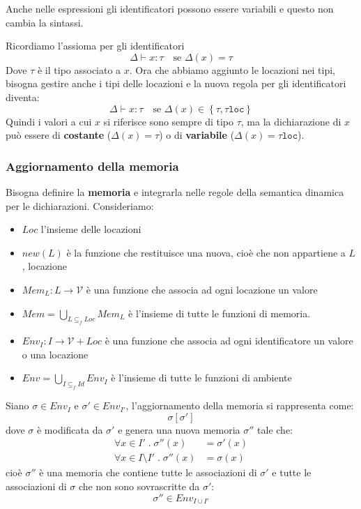 \documentclass[a4paper]{article}
\begin{document}
\begin{define}
  Anche nelle espressioni gli identificatori possono essere variabili e questo non
  cambia la sintassi.
\end{define}
Ricordiamo l'assioma per gli identificatori
\[
  \Delta \vdash x: \tau \quad \text{se } \Delta(x) = \tau
\] 
Dove \( \tau \) è il tipo associato a \( x \). Ora che abbiamo aggiunto le locazioni
nei tipi, bisogna gestire anche i tipi delle locazioni e la nuova regola per gli 
identificatori diventa:
\[
  \Delta \vdash x: \tau \quad \text{se } \Delta(x) \in \left\{ \tau, \tau\texttt{loc} \right\}
\] 
Quindi i valori a cui \( x \) si riferisce sono sempre di tipo \( \tau \), ma la
dichiarazione di \( x \) può essere di \textbf{costante} (\( \Delta(x) = \tau \)) o di
\textbf{variabile} (\( \Delta(x) = \tau\texttt{loc} \)).

\subsubsection{Aggiornamento della memoria}
Bisogna definire la \textbf{memoria} e integrarla nelle regole della semantica dinamica
per le dichiarazioni. Consideriamo:
\begin{itemize}
  \item \( Loc \) l'insieme delle locazioni

  \item \( new(L) \) è la funzione che restituisce una nuova, cioè che non appartiene
    a \( L \), locazione

  \item \( Mem_L: L \to \mathcal{V} \) è una funzione che associa ad ogni locazione un
    valore

  \item \( Mem = \bigcup_{L \subseteq_f Loc} Mem_L \) è l'insieme di tutte le funzioni
    di memoria.

  \item \( Env_I: I \to \mathcal{V} + Loc \) è una funzione che associa ad ogni
    identificatore un valore o una locazione

  \item \( Env = \bigcup_{I \subseteq_f Id} Env_I \) è l'insieme di tutte le funzioni
    di ambiente
\end{itemize}

\noindent
Siano \( \sigma  \in Env_I \) e \( \sigma' \in Env_{I'} \),
l'aggiornamento della memoria si rappresenta come:
\[
  \sigma[\sigma']
\] 
dove \( \sigma \) è modificata da \( \sigma' \) e genera una nuova memoria \( \sigma'' \)
tale che:
\[
  \begin{aligned}
    \forall x \in I' \;.\; \sigma''(x) & = \sigma'(x) \\
    \forall x \in I \setminus I' \;.\; \sigma''(x) & = \sigma(x)
  \end{aligned}
\] 
cioè \( \sigma'' \) è una memoria che contiene tutte le associazioni di \( \sigma' \) e
tutte le associazioni di \( \sigma \) che non sono sovrascritte da \( \sigma' \):
\[
  \sigma'' \in Env_{I \cup I'}
\] 
\end{document}
